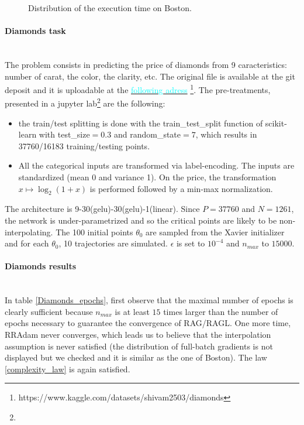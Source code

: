 \begin{figure}[h!]
	\centering
	\scalebox{0.9}{}
	\caption{Distribution of the execution time on Boston.}
	\label{Boston_time}
\end{figure}

\paragraph{Diamonds task}
~~\\
The problem consists in predicting the price of diamonds from 9 caracteristics: number of carat, the color, the clarity, etc. The original file is available at the git deposit and
it is uploadable at the \href{https://www.kaggle.com/datasets/shivam2503/diamonds}{\textcolor{cyan}{following adress}}
\footnote{https://www.kaggle.com/datasets/shivam2503/diamonds}. The pre-treatments, presented in a jupyter lab\footnote{} are the following:
\begin{itemize}
	\item the train/test splitting is done with the train\_test\_split function of scikit-learn with test\_size$=0.3$ and random\_state$=7$, which results in \\ 37760/16183 training/testing points. 
	\item All the categorical inputs are transformed via label-encoding. The inputs are standardized (mean 0 and variance 1). On the price, the transformation $x \mapsto \log_2(1+x)$ is performed followed by a min-max normalization. 
\end{itemize}
The architecture is 9-30(gelu)-30(gelu)-1(linear). Since $P=37760$ and $N=1261$, the network is under-parametrized and so the critical points are likely to be non-interpolating.
The 100 initial points $\theta_0$ are sampled from the Xavier initializer and for each $\theta_0$, 10 trajectories are simulated. $\epsilon$ is set to $10^{-4}$ and $n_{max}$ to $15000$.

\paragraph{Diamonds results}
~~\\
In table \ref{Diamonds_epochs}, first observe that the maximal number of epochs is clearly sufficient because $n_{max}$ is at least $15$ times larger than the number of epochs
necessary to guarantee the convergence of RAG/RAGL. One more time, RRAdam never converges, which leads us to believe that the interpolation assumption is never satisfied (the
distribution of full-batch gradients is not displayed but we checked and it is similar as the one of Boston). The law \eqref{complexity_law} is again satisfied. 

